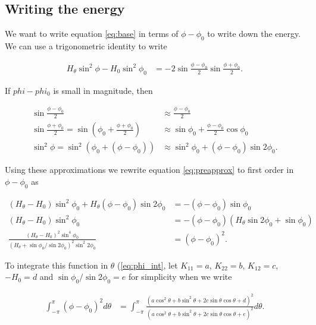 \subsection{Writing the energy}

We want to write equation \ref{eq:base} in terms of $\phi-\phi_0$ to write down the energy. We can use a trigonometric identity to write

\begin{align}
    H_\theta \sin^2\phi - H_0 \sin^2\phi_0 &= -2 \sin \frac{\phi - \phi_0}{2} \sin\frac{\phi + \phi_0}{2}. \label{eq:preapprox}
\end{align}

\noindent If $phi - phi_0$ is small in magnitude, then 

\begin{align*}
    \sin\frac{\phi - \phi_0}{2} &\approx \frac{\phi - \phi_0}{2} \\
    \sin\frac{\phi + \phi_0}{2} = \sin\left(\phi_0 + \frac{\phi + \phi_0}{2} \right) &\approx \sin\phi_0 + \frac{\phi - \phi_0}{2} \cos\phi_0 \\
    \sin^2\phi = \sin^2\left(\phi_0 + (\phi - \phi_0) \right) &\approx \sin^2\phi_0 +(\phi - \phi_0)\sin2\phi_0.
\end{align*}

Using these approximations we rewrite equation \ref{eq:preapprox} to first order in $\phi - \phi_0$ as

\begin{align*}
    (H_\theta - H_0) \sin^2\phi_0 + H_\theta (\phi - \phi_0)\sin2\phi_0 &= -(\phi - \phi_0) \sin\phi_0 \\
    (H_\theta - H_0) \sin^2\phi_0 &= -(\phi-\phi_0) (H_\theta \sin2\phi_0 + \sin\phi_0) \\
    \frac{(H_\theta-H_0)^2 \sin^4\phi_0}{(H_\theta + \sin\phi_0 / \sin2\phi_0)^2 \sin^2 2\phi_0} &= (\phi - \phi_0)^2.
\end{align*}

To integrate this function in $\theta$ (\cref{eq:phi_int}, let $K_{11} = a$, $K_{22} = b$, $K_{12} = c$, $-H_0 = d$ and $\sin\phi_0/ \sin 2 \phi_0 = e$ for simplicity when we write

\begin{align}
    \int_{-\pi}^\pi (\phi - \phi_0)^2 d\theta &= \int_{-\pi}^\pi \frac{\left(a\cos^2\theta + b\sin^2\theta + 2c\sin\theta\cos\theta + d \right)^2}{\left(a\cos^2\theta + b\sin^2\theta + 2c\sin\theta\cos\theta + e \right)^2} d\theta. \label{eq:integral}
\end{align}

